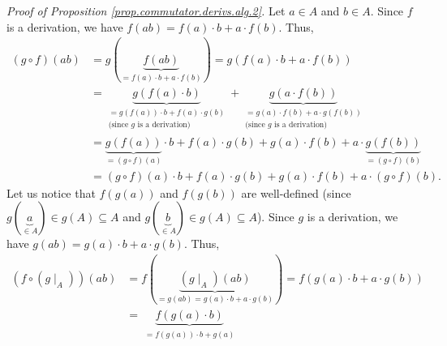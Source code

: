 \documentclass[etingof-lie.tex]{subfiles}
\begin{document}
\begin{verlong}
\textit{Proof of Proposition \ref{prop.commutator.derivs.alg.2}.} Let $a\in A$
and $b\in A$. Since $f$ is a derivation, we have $f\left(  ab\right)
=f\left(  a\right)  \cdot b+a\cdot f\left(  b\right)  $. Thus,%
\begin{align*}
\left(  g\circ f\right)  \left(  ab\right)   &  =g\left(  \underbrace{f\left(
ab\right)  }_{=f\left(  a\right)  \cdot b+a\cdot f\left(  b\right)  }\right)
=g\left(  f\left(  a\right)  \cdot b+a\cdot f\left(  b\right)  \right) \\
&  =\underbrace{g\left(  f\left(  a\right)  \cdot b\right)  }%
_{\substack{=g\left(  f\left(  a\right)  \right)  \cdot b+f\left(  a\right)
\cdot g\left(  b\right)  \\\text{(since }g\text{ is a derivation)}%
}}+\underbrace{g\left(  a\cdot f\left(  b\right)  \right)  }%
_{\substack{=g\left(  a\right)  \cdot f\left(  b\right)  +a\cdot g\left(
f\left(  b\right)  \right)  \\\text{(since }g\text{ is a derivation)}}}\\
&  =\underbrace{g\left(  f\left(  a\right)  \right)  }_{=\left(  g\circ
f\right)  \left(  a\right)  }\cdot b+f\left(  a\right)  \cdot g\left(
b\right)  +g\left(  a\right)  \cdot f\left(  b\right)  +a\cdot
\underbrace{g\left(  f\left(  b\right)  \right)  }_{=\left(  g\circ f\right)
\left(  b\right)  }\\
&  =\left(  g\circ f\right)  \left(  a\right)  \cdot b+f\left(  a\right)
\cdot g\left(  b\right)  +g\left(  a\right)  \cdot f\left(  b\right)
+a\cdot\left(  g\circ f\right)  \left(  b\right)  .
\end{align*}
Let us notice that $f\left(  g\left(  a\right)  \right)  $ and $f\left(
g\left(  b\right)  \right)  $ are well-defined (since $g\left(  \underbrace{a}%
_{\in A}\right)  \in g\left(  A\right)  \subseteq A$ and $g\left(
\underbrace{b}_{\in A}\right)  \in g\left(  A\right)  \subseteq A$). Since $g$
is a derivation, we have $g\left(  ab\right)  =g\left(  a\right)  \cdot
b+a\cdot g\left(  b\right)  $. Thus,%
\begin{align*}
\left(  f\circ\left(  g\mid_{A}\right)  \right)  \left(  ab\right)   &
=f\left(  \underbrace{\left(  g\mid_{A}\right)  \left(  ab\right)
}_{=g\left(  ab\right)  =g\left(  a\right)  \cdot b+a\cdot g\left(  b\right)
}\right)  =f\left(  g\left(  a\right)  \cdot b+a\cdot g\left(  b\right)
\right) \\
&  =\underbrace{f\left(  g\left(  a\right)  \cdot b\right)  }%
_{\substack{=f\left(  g\left(  a\right)  \right)  \cdot b+g\left(  a\right)
}}
\end{align*}
\end{verlong}
\end{document}
